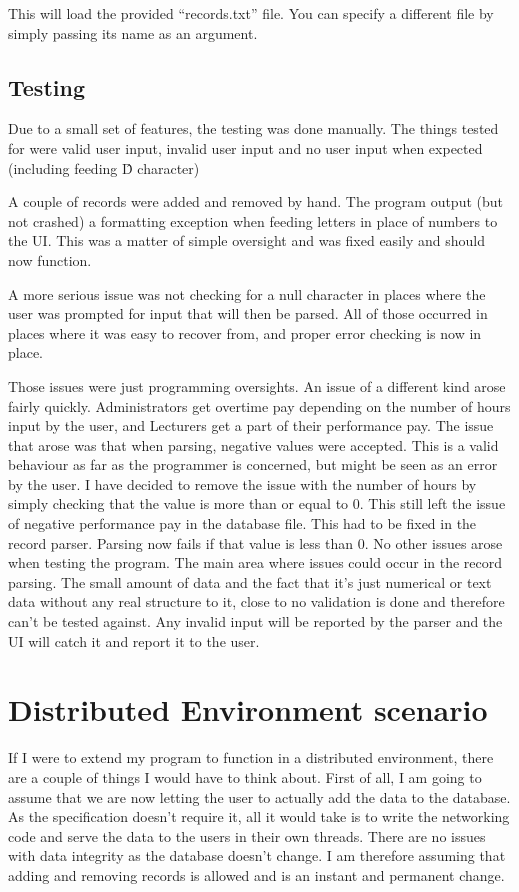 \documentclass{report}
\begin{document}
This will load the provided ``records.txt'' file. You can specify a
different file by simply passing its name as an argument.

\subsection*{Testing}
Due to a small set of features, the testing was done manually. The
things tested for were valid user input, invalid user input and no
user input when expected (including feeding \^D character)

A couple of records were added and removed by hand. The program output
(but not crashed) a formatting exception when feeding letters in place
of numbers to the UI. This was a matter of simple oversight and was
fixed easily and should now function.

A more serious issue was not checking for a null character in places
where the user was prompted for input that will then be parsed. All of
those occurred in places where it was easy to recover from, and proper
error checking is now in place.

Those issues were just programming oversights. An issue of a different
kind arose fairly quickly. Administrators get overtime pay depending
on the number of hours input by the user, and Lecturers get a part of
their performance pay. The issue that arose was that when parsing,
negative values were accepted. This is a valid behaviour as far as the
programmer is concerned, but might be seen as an error by the user. I
have decided to remove the issue with the number of hours by simply
checking that the value is more than or equal to 0. This still left
the issue of negative performance pay in the database file. This had
to be fixed in the record parser. Parsing now fails if that value is
less than 0. No other issues arose when testing the program. The main
area where issues could occur in the record parsing. The small amount
of data and the fact that it's just numerical or text data without any
real structure to it, close to no validation is done and therefore
can't be tested against. Any invalid input will be reported by the
parser and the UI will catch it and report it to the user.


\section*{Distributed Environment scenario}
If I were to extend my program to function in a distributed
environment, there are a couple of things I would have to think about.
First of all, I am going to assume that we are now letting the user to
actually add the data to the database. As the specification doesn't
require it, all it would take is to write the networking code and
serve the data to the users in their own threads. There are no issues
with data integrity as the database doesn't change. I am therefore
assuming that adding and removing records is allowed and is an instant
and permanent change.
\end{document}
